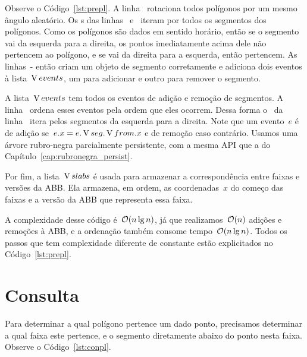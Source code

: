 \documentclass[main.tex]{subfiles}
\begin{document}
Observe o Código~\ref{lst:prepl}. A linha~ rotaciona todos polígonos por um mesmo ângulo aleatório. Os s das linhas~ e~ iteram por todos os segmentos dos polígonos. Como os polígonos são dados em sentido horário, então se o segmento vai da esquerda para a direita, os pontos imediatamente acima dele não pertencem ao polígono, e se vai da direita para a esquerda, então pertencem. As linhas~\mbox{-} então criam um objeto de segmento corretamente e adiciona dois eventos à lista~$\operatorname{V}{events}$, um para adicionar e outro para remover o segmento.

A lista~$\operatorname{V}{events}$ tem todos os eventos de adição e remoção de segmentos. A linha~ ordena esses eventos pela ordem que eles ocorrem. Dessa forma o~ da linha~ itera pelos segmentos da esquerda para a direita. Note que um evento~$e$ é de adição se~${e.x = e.\operatorname{V}{seg}.\operatorname{V}{from}.x}$ e de remoção caso contrário. Usamos uma árvore rubro-negra parcialmente persistente, com a mesma API que a do Capítulo~\ref{cap:rubronegra_persist}.

Por fim, a lista~$\operatorname{V}{slabs}$ é usada para armazenar a correspondência entre faixas e versões da ABB. Ela armazena, em ordem, as coordenadas~$x$ do começo das faixas e a versão da ABB que representa essa faixa.

A complexidade desse código é~$\mathcal{O}(n \lg n)$, já que realizamos~$\mathcal{O}(n)$ adições e remoções à ABB, e a ordenação também consome tempo~$\mathcal{O}(n \lg n)$. Todos os passos que tem complexidade diferente de constante estão explicitados no Código~\ref{lst:prepl}.

\section{Consulta}

Para determinar a qual polígono pertence um dado ponto, precisamos determinar a qual faixa este pertence, e o segmento diretamente abaixo do ponto nesta faixa. Observe o Código~\ref{lst:conpl}.

\providecommand{\roots}{\V{roots}}
\providecommand{\below}{\V{below}}
\providecommand{\val}{\V{value}}
\end{document}
